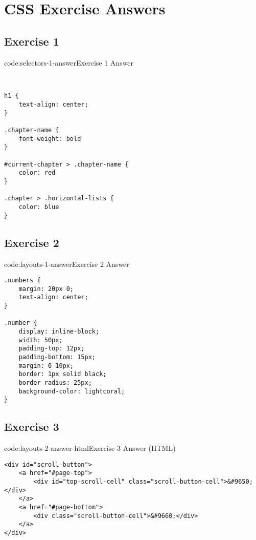 \section{CSS Exercise Answers}\label{sect:css-exercise-answers}

\subsection*{Exercise 1}

\begin{codeenv}{code:selectors-1-answer}{Exercise 1 Answer}\begin{verbatim}
    

h1 {
    text-align: center;
}

.chapter-name {
    font-weight: bold
}

#current-chapter > .chapter-name {
    color: red
}

.chapter > .horizontal-lists {
    color: blue
}
\end{verbatim}
\end{codeenv}

\subsection*{Exercise 2}

\begin{codeenv}{code:layouts-1-answer}{Exercise 2 Answer}\begin{verbatim}
.numbers {
    margin: 20px 0;
    text-align: center;
}

.number {
    display: inline-block;
    width: 50px;
    padding-top: 12px;
    padding-bottom: 15px;
    margin: 0 10px;
    border: 1px solid black;
    border-radius: 25px;
    background-color: lightcoral;
}
\end{verbatim}
\end{codeenv}

\subsection*{Exercise 3}

\begin{codeenv}{code:layouts-2-answer-html}{Exercise 3 Answer (HTML)}\begin{verbatim}
<div id="scroll-button">
    <a href="#page-top">
        <div id="top-scroll-cell" class="scroll-button-cell">&#9650;</div>
    </a>
    <a href="#page-bottom">
        <div class="scroll-button-cell">&#9660;</div>
    </a>
</div>
\end{verbatim}
\end{codeenv}


